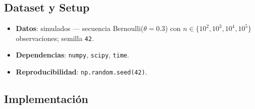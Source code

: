 \subsection*{Dataset y Setup}

\begin{itemize}
  \item \textbf{Datos}: simulados --- secuencia Bernoulli($\theta=0.3$) con
    $n \in \{10^2, 10^3, 10^4, 10^5\}$ observaciones; semilla \texttt{42}.
  \item \textbf{Dependencias}: \texttt{numpy}, \texttt{scipy}, \texttt{time}.
  \item \textbf{Reproducibilidad}: \texttt{np.random.seed(42)}.
\end{itemize}

\subsection*{Implementación}

